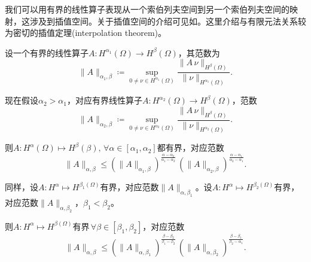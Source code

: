 我们可以用有界的线性算子表现从一个索伯列夫空间到另一个索伯列夫空间的映射，这涉及到插值空间。关于插值空间的介绍可见如\cite{Adams:2003wi}。这里介绍与有限元法关系较为密切的插值定理(interpolation theorem)。
\begin{theorem}[插值定理]
  \label{theorem:sobolev-interpolation-theorem}
  设一个有界的线性算子$A:H^{\alpha_1}(\Omega) \rightarrow H^{\beta}(\Omega)$，其范数为
  \begin{equation*}
    \big\| A \big\|_{\alpha_1,\beta} \coloneqq \sup_{0 \neq \nu \in H^{\alpha_1}(\Omega)} \frac{
    \big\| A \, \nu \big\|_{H^{\beta} (\Omega)}
    }{
    \big\| \nu \big\|_{H^{\alpha_1}(\Omega)}
    }.
  \end{equation*}

现在假设$\alpha_2 > \alpha_1$，对应有界线性算子$A:H^{\alpha_2}(\Omega) \rightarrow H^{\beta}(\Omega)$，范数
\begin{equation*}
  \big\| A \big\|_{\alpha_2,\beta} \coloneqq \sup_{0 \neq \nu \in H^{\alpha_2}(\Omega)} \frac{
  \big\| A \, \nu \big\|_{H^{\beta} (\Omega)}
  }{
  \big\| \nu \big\|_{H^{\alpha_2}(\Omega)}
  }.
\end{equation*}

则$A:H^{\alpha}(\Omega) \mapsto H^{\beta}(\beta), \, \forall \alpha \in \left[ \alpha_1, \alpha_2 \right]$都有界，对应范数
\begin{equation*}
  \big\| A \big\|_{\alpha, \beta} \le
  \left(
  \big\| A \big\|_{\alpha_1,\beta}
  \right)^{\frac{\alpha - \alpha_2}{\alpha_1 - \alpha_2}} \,
  \left(
  \big\| A \big\|_{\alpha_2,\beta}
  \right)^{\frac{\alpha - \alpha_1}{\alpha_2 - \alpha_1}}.
\end{equation*}

同样，设$A:H^{\alpha} \mapsto H^{\beta_1(\Omega)}$有界，对应范数$\big\| A \big\|_{\alpha, \beta_1}$。设$A:H^{\alpha} \mapsto H^{\beta_2(\Omega)}$有界，对应范数$\big\| A \big\|_{\alpha, \beta_2}$，$\beta_1 < \beta_2$。

则$A:H^{\alpha} \mapsto H^{\beta(\Omega)}$有界$\, \forall \beta \in \left[ \beta_1, \beta_2 \right]$，对应范数
\begin{equation*}
  \big\| A \big\|_{\alpha, \beta} \le
  \left(
  \big\| A \big\|_{\alpha,\beta_1}
  \right)^{\frac{\beta - \beta_2}{\beta_1 - \beta_2}} \,
  \left(
  \big\| A \big\|_{\alpha,\beta_2}
  \right)^{\frac{\beta - \beta_1}{\beta_2 - \alpha_1}}.
\end{equation*}
\end{theorem}


